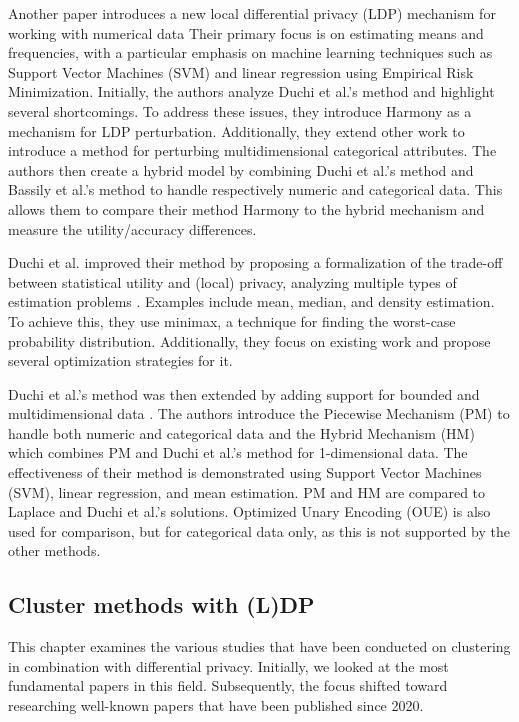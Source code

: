 Another paper introduces a new local differential privacy (LDP) mechanism for working with numerical data \citep{nguyen_collecting_2016}
Their primary focus is on estimating means and frequencies, with a particular emphasis on machine learning techniques such as Support Vector Machines (SVM) and linear regression using Empirical Risk Minimization.
Initially, the authors analyze Duchi et al.'s method \citep{duchi_privacy_2013} and highlight several shortcomings.
To address these issues, they introduce Harmony as a mechanism for LDP perturbation.
Additionally, they extend other work \citep{bassily_local_2015} to introduce a method for perturbing multidimensional categorical attributes.
The authors then create a hybrid model by combining Duchi et al.'s method and Bassily et al.'s method to handle respectively numeric and categorical data.
This allows them to compare their method Harmony to the hybrid mechanism and measure the utility/accuracy differences.

Duchi et al. improved their method by proposing a formalization of the trade-off between statistical utility and (local) privacy, analyzing multiple types of estimation problems \citep{duchi_minimax_2017}.
Examples include mean, median, and density estimation.
To achieve this, they use minimax, a technique for finding the worst-case probability distribution.
Additionally, they focus on existing work and propose several optimization strategies for it.

Duchi et al.'s method was then extended by adding support for bounded and multidimensional data \citep{wang_collecting_2019}.
The authors introduce the Piecewise Mechanism (PM) to handle both numeric and categorical data and the Hybrid Mechanism (HM) which combines PM and Duchi et al.'s method for 1-dimensional data.
The effectiveness of their method is demonstrated using Support Vector Machines (SVM), linear regression, and mean estimation.
PM and HM are compared to Laplace and Duchi et al.'s solutions.
Optimized Unary Encoding (OUE) \citep{wang_locally_nodate} is also used for comparison, but for categorical data only, as this is not supported by the other methods.


\subsection{Cluster methods with (L)DP}
This chapter examines the various studies that have been conducted on clustering in combination with differential privacy.
Initially, we looked at the most fundamental papers in this field. Subsequently, the focus shifted toward researching well-known papers that have been published since 2020.

